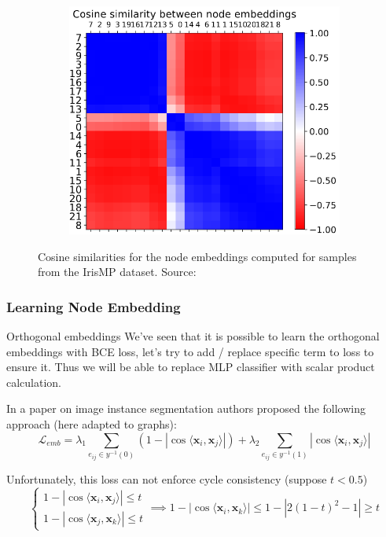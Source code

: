 \documentclass{beamer}
\begin{document}
\begin{frame}
\begin{figure}
\begin{subfigure}{0.5\linewidth}
        \end{subfigure}
        \begin{subfigure}{0.49\linewidth}
            \centering
            \includegraphics[height=0.53\textwidth]{emb4.png}
        \end{subfigure}
        \caption{Cosine similarities for the node embeddings
            computed for samples from the IrisMP dataset.
            Source: \cite{jung2022learning}}
    \end{figure}

\end{frame}

\begin{frame}
    \frametitle{Learning Node Embedding}

    \begin{block}{Orthogonal embeddings}
        We've seen that it is possible to learn the orthogonal
        embeddings with BCE loss,
        let's try to add / replace specific term to loss
        to ensure it. Thus we will be able to replace MLP classifier with
        scalar product calculation.
    \end{block}
    In a paper \cite{chen2019instance} on image instance segmentation
    authors proposed the following approach (here adapted to graphs):
    \[
        \mathcal{L}_{emb} =
        \lambda_1 \sum\limits_{e_{ij} \in y^{-1}(0)} \left(1 - |\cos \langle \mathbf{x}_i, \mathbf{x}_j \rangle| \right) +
        \lambda_2 \sum\limits_{e_{ij} \in y^{-1}(1)} |\cos \langle \mathbf{x}_i, \mathbf{x}_j \rangle|
    \]

    Unfortunately, this loss can not enforce cycle consistency
    (suppose $t < 0.5$)
    \[
        \begin{cases}
            1 - |\cos \langle \mathbf{x}_i, \mathbf{x}_j \rangle| \leq t \\
            1 - |\cos \langle \mathbf{x}_j, \mathbf{x}_k \rangle| \leq t
        \end{cases} \implies
        1 - |\cos \langle \mathbf{x}_i, \mathbf{x}_k \rangle| \leq
        1 - |2(1 - t)^2 - 1| \geq t
    \]

\end{frame}
\end{document}
